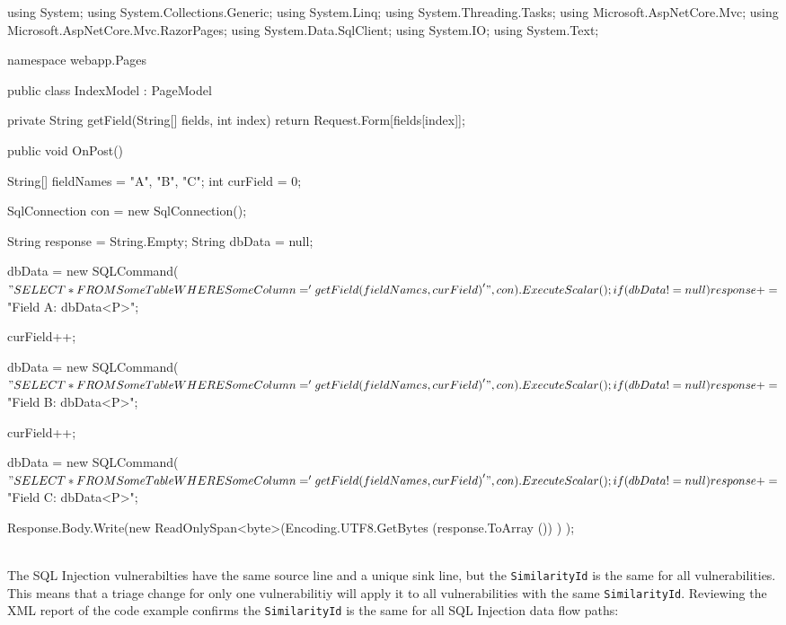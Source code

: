 \begin{code}{}{}{}
using System;
using System.Collections.Generic;
using System.Linq;
using System.Threading.Tasks;
using Microsoft.AspNetCore.Mvc;
using Microsoft.AspNetCore.Mvc.RazorPages;
using System.Data.SqlClient;
using System.IO;
using System.Text;

namespace webapp.Pages
{
    public class IndexModel : PageModel
    {

        private String getField(String[] fields, int index)
        {
            return Request.Form[fields[index]];
        }


        public void OnPost()
        {

            String[] fieldNames = {"A", "B", "C"};
            int curField = 0;
                        
            SqlConnection con = new SqlConnection();

            String response = String.Empty;
            String dbData = null;
            
            dbData = new SQLCommand($"SELECT * FROM SomeTable WHERE SomeColumn = '{getField(fieldNames, curField)}'", con).ExecuteScalar();
            if (dbData != null)
              response += $"Field A: {dbData}<P>";
            
            curField++;

            dbData = new SQLCommand($"SELECT * FROM SomeTable WHERE SomeColumn = '{getField(fieldNames, curField)}'", con).ExecuteScalar();
            if (dbData != null)
              response += $"Field B: {dbData}<P>";

            curField++;

            dbData = new SQLCommand($"SELECT * FROM SomeTable WHERE SomeColumn = '{getField(fieldNames, curField)}'", con).ExecuteScalar();
            if (dbData != null)
              response += $"Field C: {dbData}<P>";
            
            Response.Body.Write(new ReadOnlySpan<byte>(Encoding.UTF8.GetBytes (response.ToArray ()) ) );
        }
    }
}

\end{code}

\noindent\\The SQL Injection vulnerabilties have the same source line and a unique sink line, but the \texttt{SimilarityId} is the same for all vulnerabilities.  
This means that a triage change for only one vulnerabilitiy will apply it to all vulnerabilities with the same \texttt{SimilarityId}.  Reviewing the XML report of the 
code example confirms the \texttt{SimilarityId} is the same for all SQL Injection data flow paths:

